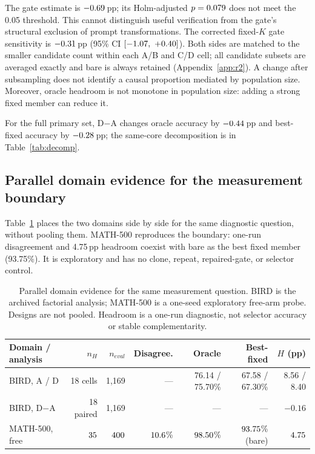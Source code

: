 The gate estimate is $-0.69$\,pp; its Holm-adjusted
$p=0.079$ does not meet the 0.05 threshold.
This cannot distinguish useful verification from the gate's structural
exclusion of prompt transformations. The corrected fixed-$K$ gate sensitivity
is $-0.31$\,pp (95\% CI $[-1.07,\ +0.40]$).
Both sides are matched to the smaller candidate count within each A/B and
C/D cell; all candidate subsets are averaged exactly and bare is always
retained (Appendix~\ref{app:r2}). A change after subsampling
does not identify a causal proportion mediated by population size.
Moreover, oracle headroom is not monotone in population size: adding a
strong fixed member can reduce it.

\begin{table}[t]
\centering\footnotesize

\caption{\textbf{Same-core headroom decomposition.} All arms use identical
400 tasks and identical bare outcomes. $K_{\rm cand}$ excludes bare and
$K_{\rm total}=K_{\rm cand}+1$; counts and accuracies are cell means.
Headroom is oracle minus best-fixed accuracy, not realized routing gain.}
\label{tab:decomp}
\end{table}

For the full primary set, D$-$A changes oracle accuracy by
$-0.44$\,pp and best-fixed accuracy by
$-0.28$\,pp; the same-core decomposition is in
Table~\ref{tab:decomp}.

\subsection{Parallel domain evidence for the measurement boundary}
Table~\ref{tab:domain-main} places the two domains side by side for the
same diagnostic question, without pooling them. MATH-500 reproduces the
boundary: one-run disagreement and 4.75\,pp headroom coexist with bare as
the best fixed member (93.75\%). It is exploratory and has no clone,
repeat, repaired-gate, or selector control.

\begin{table}[t]
\centering
\scriptsize
\setlength{\tabcolsep}{2.5pt}
\begin{tabular}{@{}lrrrrrr@{}}
\toprule
Domain / analysis & $n_H$ & $n_{eval}$ & Disagree. & Oracle & Best-fixed & $H$ (pp) \\
\midrule
BIRD, A / D & 18 cells & 1,169 & --- & 76.14 / 75.70\% & 67.58 / 67.30\% & 8.56 / 8.40 \\
BIRD, D$-$A & 18 paired & 1,169 & --- & --- & --- & $-0.16$ \\
MATH-500, free & $35$ & $400$ & $10.6$\% & $98.50$\% & $93.75$\% (bare) & $4.75$ \\
\bottomrule
\end{tabular}
\caption{Parallel domain evidence for the same measurement question. BIRD
is the archived factorial analysis; MATH-500 is a one-seed exploratory
free-arm probe. Designs are not pooled. Headroom is a one-run diagnostic,
not selector accuracy or stable complementarity.}
\label{tab:domain-main}
\end{table}

